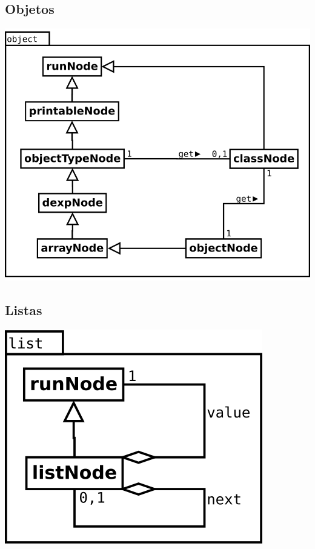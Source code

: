\subsection {Objetos}
\begin{center}
\includegraphics[scale=0.4]{object.png} \\
\end{center}

\subsection {Listas}
\begin{center}
\includegraphics[scale=0.4]{list.png} \\
\end{center}

